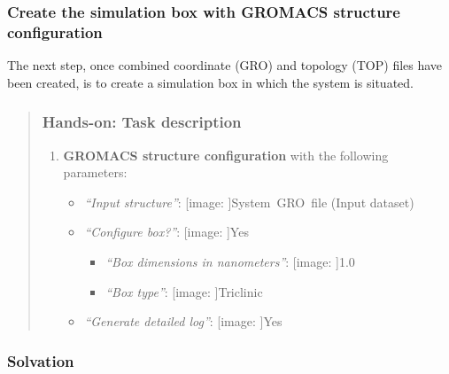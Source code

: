 \documentclass[twocolumn]{bmcart}%
\def\texttt{[image: ]}
\providecommand{\tightlist}{%
  \setlength{\itemsep}{0pt}\setlength{\parskip}{0pt}}
\begin{document}
\hypertarget{create-the-simulation-box-with-gromacs-structure-configuration}{%
\subsubsection{\texorpdfstring{Create the simulation box with
\textbf{GROMACS structure
configuration}}{Create the simulation box with GROMACS structure configuration}}\label{create-the-simulation-box-with-gromacs-structure-configuration}}

The next step, once combined coordinate (GRO) and topology (TOP) files
have been created, is to create a simulation box in which the system is
situated.

\begin{quote}
\hypertarget{hands-on-task-description-3}{%
\subsubsection{Hands-on: Task
description}\label{hands-on-task-description-3}}

\begin{enumerate}
\def\labelenumi{\arabic{enumi}.}
\tightlist
\item
  \textbf{GROMACS structure configuration} with the following
  parameters:

  \begin{itemize}
  \tightlist
  \item
    \emph{``Input structure''}: \texttt{System\ GRO\ file} (Input
    dataset)
  \item
    \emph{``Configure box?''}: \texttt{Yes}

    \begin{itemize}
    \tightlist
    \item
      \emph{``Box dimensions in nanometers''}: \texttt{1.0}
    \item
      \emph{``Box type''}: \texttt{Triclinic}
    \end{itemize}
  \item
    \emph{``Generate detailed log''}: \texttt{Yes}
  \end{itemize}
\end{enumerate}


\end{quote}

\hypertarget{solvation}{%
\subsubsection{Solvation}\label{solvation}}
\end{document}
